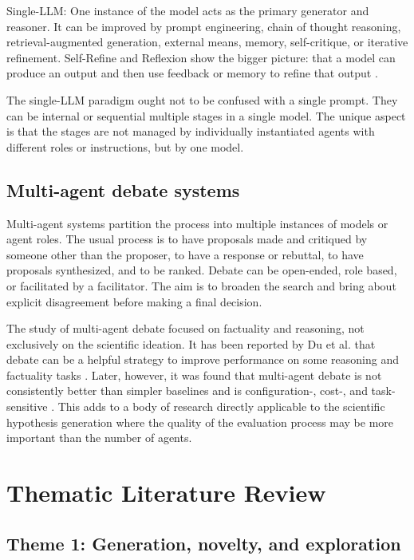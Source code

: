 \documentclass[acmsmall,screen,review]{acmart}
\begin{document}
Single-LLM: One instance of the model acts as the primary generator and reasoner. It can be improved by prompt engineering, chain of thought reasoning, retrieval-augmented generation, external means, memory, self-critique, or iterative refinement. Self-Refine and Reflexion show the bigger picture: that a model can produce an output and then use feedback or memory to refine that output \cite{madaan2023selfrefine,shinn2023reflexion}.

The single-LLM paradigm ought not to be confused with a single prompt. They can be internal or sequential multiple stages in a single model. The unique aspect is that the stages are not managed by individually instantiated agents with different roles or instructions, but by one model.


\subsection{Multi-agent debate systems}
\label{subsec:multi-agent}

Multi-agent systems partition the process into multiple instances of models or agent roles. The usual process is to have proposals made and critiqued by someone other than the proposer, to have a response or rebuttal, to have proposals synthesized, and to be ranked. Debate can be open-ended, role based, or facilitated by a facilitator. The aim is to broaden the search and bring about explicit disagreement before making a final decision.

The study of multi-agent debate focused on factuality and reasoning, not exclusively on the scientific ideation. It has been reported by Du et al. that debate can be a helpful strategy to improve performance on some reasoning and factuality tasks \cite{du2024improving}. Later, however, it was found that multi-agent debate is not consistently better than simpler baselines and is configuration-, cost-, and task-sensitive \cite{smit2024mad}. This adds to a body of research directly applicable to the scientific hypothesis generation where the quality of the evaluation process may be more important than the number of agents.



\section{Thematic Literature Review}
\label{sec:thematic-literature-review}

\subsection{Theme 1: Generation, novelty, and exploration}
\label{subsec:generation-novelty-exploration}
\end{document}
